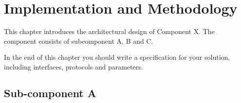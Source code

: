 \chapter{Implementation and Methodology\label{cha:chapter4}}
This chapter introduces the architectural design of Component X. The component consists of subcomponent A, B and C.

In the end of this chapter you should write a specification for your solution, including interfaces, protocols and parameters.

\section{Sub-component A\label{sec:conceptsuba}}

